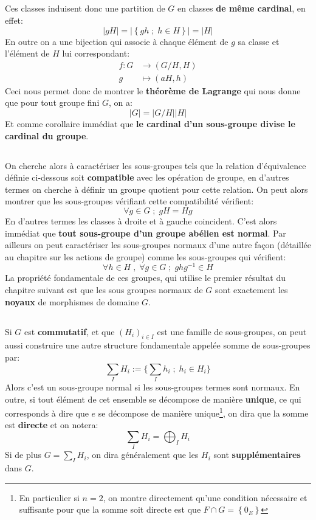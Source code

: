 \subsection*{}
Ces classes induisent donc une partition de \( G \) en classes \textbf{de même cardinal}, en effet:
\[ 
   |gH| = \left|\left\{ gh \; ; \; h \in H \right\} \right| = |H|
\]
En outre on a une bijection qui associe à chaque élément de \( g \) sa classe et l'élément de \( H \) lui correspondant:
\[ 
   \begin{aligned}
      f : G &\longrightarrow (G/H, H)\\
      g &\longmapsto (aH, h)
   \end{aligned}
\]
Ceci nous permet donc de montrer le \textbf{théorème de Lagrange} qui nous donne que pour tout groupe fini \( G \), on a:
\[ 
   |G| = |G/H||H|
\]
Et comme corollaire immédiat que \textbf{le cardinal d'un sous-groupe divise le cardinal du groupe}.
\subsection*{}
On cherche alors à caractériser les sous-groupes tels que la relation d'équivalence définie ci-dessous soit \textbf{compatible} avec les opération de groupe, en d'autres termes on cherche à définir un groupe quotient pour cette relation. On peut alors montrer que les sous-groupes vérifiant cette compatibilité vérifient:
\[ 
   \forall g \in G \; ; \; gH = Hg 
\]
En d'autres termes les classes à droite et à gauche coincident. C'est alors immédiat que \textbf{tout sous-groupe d'un groupe abélien est normal}. Par ailleurs on peut caractériser les sous-groupes normaux d'une autre façon (détaillée au chapitre sur les actions de groupe) comme les sous-groupes qui vérifient:
\[ 
   \forall h \in H \; , \; \forall g \in G \; ; \; ghg^{-1} \in H 
\]
La propriété fondamentale de ces groupes, qui utilise le premier résultat du chapitre suivant est que les sous groupes normaux de \( G \) sont exactement les \textbf{noyaux} de morphismes de domaine \( G \).
\subsection*{}
Si \( G \) est \textbf{commutatif}, et que \( (H_i)_{i \in I} \) est une famille de sous-groupes, on peut aussi construire une autre structure fondamentale appelée somme de sous-groupes par:
\[ 
   \sum_I H_i := \Bigg\{ \sum_I h_i \; ; \; h_i \in H_i \Bigg\}  
\]
Alors c'est un sous-groupe normal si les sous-groupes termes sont normaux. En outre, si tout élément de cet ensemble se décompose de manière \textbf{unique}, ce qui corresponds à dire que \( e \) se décompose de manière unique\footnote[1]{En particulier si \( n=2 \), on montre directement qu'une condition nécessaire et suffisante pour que la somme soit directe est que \(F \cap G = \left\{ 0_E \right\}\)}, on dira que la somme est \textbf{directe} et on notera:
\[ 
   \sum_I H_i = \bigoplus_I H_i
\]
Si de plus \( G = \sum_I H_i \), on dira généralement que les \( H_i \) sont \textbf{supplémentaires} dans \( G \).
